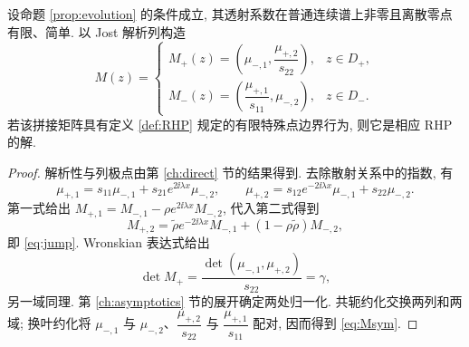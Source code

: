 \begin{proposition}\label{prop:jump}
设命题 \ref{prop:evolution} 的条件成立,
其透射系数在普通连续谱上非零且离散零点有限、简单.
以 Jost 解析列构造
\begin{equation}\label{eq:Mdef}
M(z)=\begin{cases}
M_+(z)=\left(\mu_{-,1},\dfrac{\mu_{+,2}}{s_{22}}\right),&z\in D_+,\\[6pt]
M_-(z)=\left(\dfrac{\mu_{+,1}}{s_{11}},\mu_{-,2}\right),&z\in D_-.
\end{cases}
\end{equation}
若该拼接矩阵具有定义 \ref{def:RHP} 规定的有限特殊点边界行为,
则它是相应 RHP 的解.
\end{proposition}
\begin{proof}
解析性与列极点由第 \ref{ch:direct} 节的结果得到. 去除散射关系中的指数, 有
\begin{equation*}
\mu_{+,1}=s_{11}\mu_{-,1}+s_{21}e^{2\ii\lambda x}\mu_{-,2},\qquad
\mu_{+,2}=s_{12}e^{-2\ii\lambda x}\mu_{-,1}+s_{22}\mu_{-,2}.
\end{equation*}
第一式给出 $M_{+,1}=M_{-,1}-\rho e^{2\ii\lambda x}M_{-,2}$, 代入第二式得到
\begin{equation*}
M_{+,2}=\widetilde\rho e^{-2\ii\lambda x}M_{-,1}+(1-\rho\widetilde\rho)M_{-,2},
\end{equation*}
即 \eqref{eq:jump}. Wronskian 表达式给出
\begin{equation*}
\det M_+=\dfrac{\det(\mu_{-,1},\mu_{+,2})}{s_{22}}=\gamma,
\end{equation*}
另一域同理. 第 \ref{ch:asymptotics} 节的展开确定两处归一化. 共轭约化交换两列和两域; 换叶约化将 $\mu_{-,1}$ 与 $\mu_{-,2}$、$\dfrac{\mu_{+,2}}{s_{22}}$ 与 $\dfrac{\mu_{+,1}}{s_{11}}$ 配对, 因而得到 \eqref{eq:Msym}.
\end{proof}


